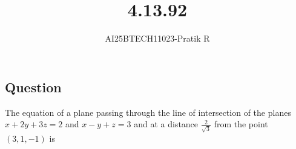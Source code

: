 \documentclass[journal]{IEEEtran}
\begin{document}

\vspace{3cm}

\title{4.13.92}
\author{AI25BTECH11023-Pratik R}
 \maketitle
{\let\newpage\relax\maketitle}

\renewcommand{\thefigure}{\theenumi}
\renewcommand{\thetable}{\theenumi}
\setlength{\intextsep}{10pt} %


\renewcommand{\thetable}{\theenumi}

\subsection*{\textbf{Question}} 
The equation of a plane passing through the line of intersection of the planes $x+2y+3z=2$ and $x-y + z = 3$ and at a distance $\frac{2}{\sqrt{3}}$ from the point $(3,1,-1)$ is 
\end{document}
